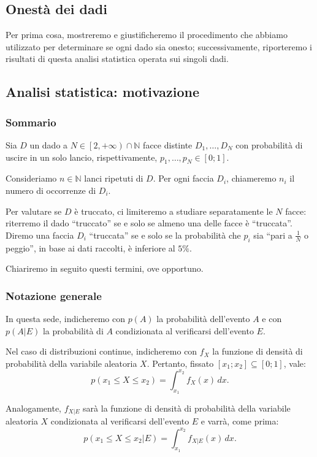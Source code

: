 \documentclass{article}
\begin{document}
\pagebreak
\begin{appendices}

\section{Onestà dei dadi}
Per prima cosa, mostreremo e giustificheremo il procedimento che abbiamo utilizzato per
determinare se ogni dado sia onesto; successivamente, riporteremo i risultati di questa
analisi statistica operata sui singoli dadi.

\subsection{Analisi statistica: motivazione}

\subsubsection{Sommario}
Sia $D$ un dado a $N\in\left[2,+\infty\right)\cap\mathbb{N}$ facce distinte
$D_1,\dots,D_N$ con probabilità di uscire in un solo lancio, rispettivamente,
$p_1,\dots,p_N\in\left[0;1\right]$.

Consideriamo $n\in\mathbb{N}$ lanci ripetuti di $D$.
Per ogni faccia $D_i$, chiameremo $n_i$ il numero di occorrenze di $D_i$.

Per valutare se $D$ è truccato, ci limiteremo a studiare separatamente le $N$ facce:
riterremo il dado “truccato” se e solo se almeno una delle facce è “truccata”.
Diremo una faccia $D_i$ “truccata” se e solo se la probabilità che $p_i$ sia “pari a $\frac{1}{N}$
o peggio”, in base ai dati raccolti, è inferiore al $5\%$.

Chiariremo in seguito questi termini, ove opportuno.

\subsubsection{Notazione generale}
In questa sede, indicheremo con $p(A)$ la probabilità dell'evento $A$ e con $p(A|E)$ la
probabilità di $A$ condizionata al verificarsi dell'evento $E$.

Nel caso di distribuzioni continue, indicheremo con $f_X$ la funzione di densità di probabilità
della variabile aleatoria $X$.
Pertanto, fissato $\left[x_1;x_2\right]\subseteq\left[0;1\right]$, vale:
\[p(x_1\le X\le x_2) = \int_{x_1}^{x_2}f_X(x)\,dx.\]

Analogamente, $f_{X|E}$ sarà la funzione di densità di probabilità della variabile aleatoria $X$
condizionata al verificarsi dell'evento $E$ e varrà, come prima:
\[p(x_1\le X\le x_2|E) = \int_{x_1}^{x_2}f_{X|E}(x)\,dx.\]


\end{appendices}
\end{document}
